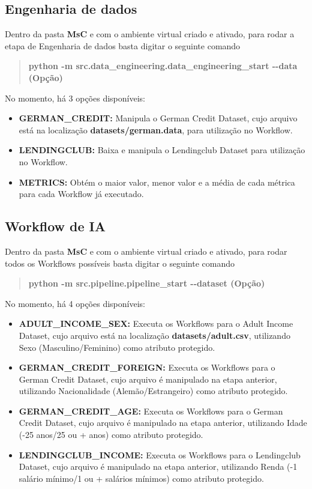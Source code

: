 \documentclass[Portugues,Final]{ic-tese-v3}
\begin{document}
\subsection{Engenharia de dados}

Dentro da pasta \textbf{MsC} e com o ambiente virtual criado e ativado, para rodar a etapa de Engenharia de dados basta digitar o seguinte comando

\begin{quote}\textbf{python -m src.data\_engineering.data\_engineering\_start -{}-data (Opção)}\end{quote}

No momento, há 3 opções disponíveis:

\begin{itemize}
    \item {\textbf{GERMAN\_CREDIT:}} Manipula o German Credit Dataset, cujo arquivo está na localização \textbf{datasets/german.data}, para utilização no Workflow.
    \item {\textbf{LENDINGCLUB:}} Baixa e manipula o Lendingclub Dataset para utilização no Workflow.
    \item {\textbf{METRICS:}} Obtém o maior valor, menor valor e a média de cada métrica para cada Workflow já executado.
\end{itemize}

\subsection{Workflow de IA}

Dentro da pasta \textbf{MsC} e com o ambiente virtual criado e ativado, para rodar todos os Workflows possíveis basta digitar o seguinte comando

\begin{quote}\textbf{python -m src.pipeline.pipeline\_start -{}-dataset (Opção)}\end{quote}

No momento, há 4 opções disponíveis:

\begin{itemize}
    \item {\textbf{ADULT\_INCOME\_SEX:}} Executa os Workflows para o Adult Income Dataset, cujo arquivo está na localização \textbf{datasets/adult.csv}, utilizando Sexo (Masculino/Feminino) como atributo protegido.
    \item {\textbf{GERMAN\_CREDIT\_FOREIGN:}} Executa os Workflows para o German Credit Dataset, cujo arquivo é manipulado na etapa anterior, utilizando Nacionalidade (Alemão/Estrangeiro) como atributo protegido.
    \item {\textbf{GERMAN\_CREDIT\_AGE:}} Executa os Workflows para o German Credit Dataset, cujo arquivo é manipulado na etapa anterior, utilizando Idade (-25 anos/25 ou + anos) como atributo protegido.
    \item {\textbf{LENDINGCLUB\_INCOME:}} Executa os Workflows para o Lendingclub Dataset, cujo arquivo é manipulado na etapa anterior, utilizando Renda (-1 salário mínimo/1 ou + salários mínimos) como atributo protegido.
\end{itemize}
\end{document}
